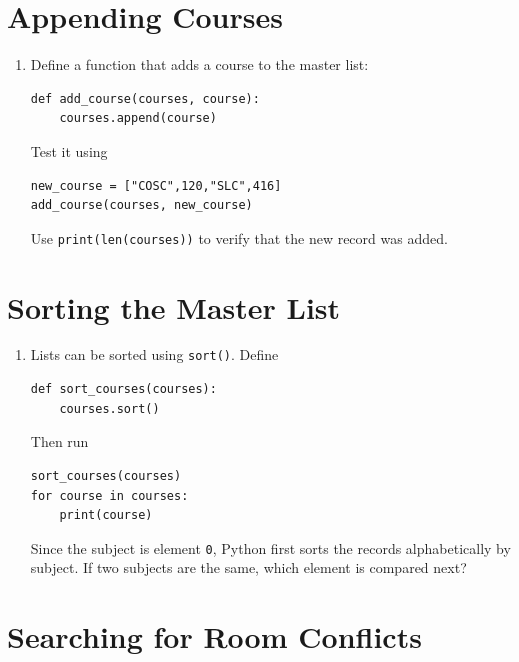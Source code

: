 \documentclass{article}
\begin{document}
\section{Appending Courses}

\begin{enumerate}

\item Define a function that adds a course to the master list:

\begin{verbatim}
def add_course(courses, course):
    courses.append(course)
\end{verbatim}

Test it using

\begin{verbatim}
new_course = ["COSC",120,"SLC",416]
add_course(courses, new_course)
\end{verbatim}

Use \verb+print(len(courses))+ to verify that the new record was added.

\end{enumerate}


\section{Sorting the Master List}

\begin{enumerate}

\item Lists can be sorted using \texttt{sort()}. Define

\begin{verbatim}
def sort_courses(courses):
    courses.sort()
\end{verbatim}

Then run

\begin{verbatim}
sort_courses(courses)
for course in courses:
    print(course)
\end{verbatim}

Since the subject is element \texttt{0}, Python first sorts the records alphabetically by subject. If two subjects are the same, which element is compared next?

\end{enumerate}


\section{Searching for Room Conflicts}
\end{document}
